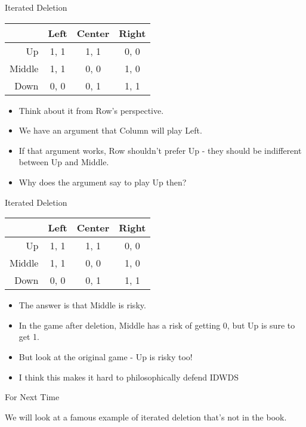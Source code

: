 \documentclass[
  ignorenonframetext,
]{beamer}
\providecommand{\tightlist}{%
  \setlength{\itemsep}{0pt}\setlength{\parskip}{0pt}}
\begin{document}
\begin{frame}{Iterated Deletion}
\protect\hypertarget{iterated-deletion-2}{}

\begin{table}[!h]
\centering
\begin{tabular}[t]{>{}r|ccc}
\toprule
 & Left & Center & Right\\
\midrule
Up & 1, 1 & 1, 1 & 0, 0\\
Middle & 1, 1 & 0, 0 & 1, 0\\
Down & 0, 0 & 0, 1 & 1, 1\\
\bottomrule
\end{tabular}
\end{table}

\begin{itemize}
\tightlist
\item
  Think about it from Row's perspective.
\item
  We have an argument that Column will play Left.
\item
  If that argument works, Row shouldn't prefer Up - they should be
  indifferent between Up and Middle.
\item
  Why does the argument say to play Up then?
\end{itemize}

\end{frame}

\begin{frame}{Iterated Deletion}
\protect\hypertarget{iterated-deletion-3}{}

\begin{table}[!h]
\centering
\begin{tabular}[t]{>{}r|ccc}
\toprule
 & Left & Center & Right\\
\midrule
Up & 1, 1 & 1, 1 & 0, 0\\
Middle & 1, 1 & 0, 0 & 1, 0\\
Down & 0, 0 & 0, 1 & 1, 1\\
\bottomrule
\end{tabular}
\end{table}

\begin{itemize}
\tightlist
\item
  The answer is that Middle is risky.
\item
  In the game after deletion, Middle has a risk of getting 0, but Up is
  sure to get 1.
\end{itemize}

\begin{itemize}[<+->]
\tightlist
\item
  But look at the original game - Up is risky too!
\item
  I think this makes it hard to philosophically defend IDWDS
\end{itemize}

\end{frame}

\begin{frame}{For Next Time}
\protect\hypertarget{for-next-time}{}

We will look at a famous example of iterated deletion that's not in the
book.

\end{frame}
\end{document}
